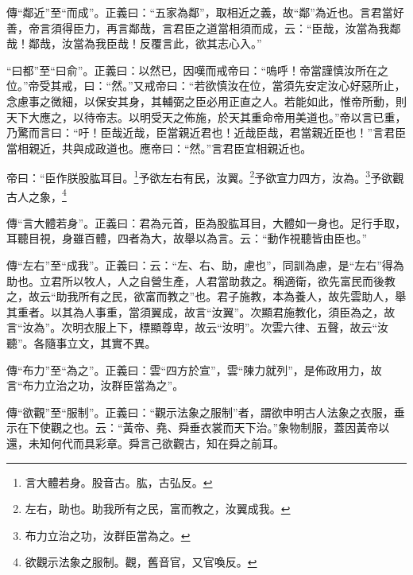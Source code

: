 {\noindent\zhuan{}\fzbyks 傳“鄰近”至“而成”。正義曰：“五家為鄰”，取相近之義，故“鄰”為近也。言君當好善，帝言須得臣力，再言鄰哉，言君臣之道當相須而成，云：“臣哉，汝當為我鄰哉！鄰哉，汝當為我臣哉！反覆言此，欲其志心入。” \par}

{\noindent\shu{}\fzkt “曰都”至“曰俞”。正義曰：以然已，因嘆而戒帝曰：“嗚呼！帝當謹慎汝所在之位。”帝受其戒，曰：“然。”又戒帝曰：“若欲慎汝在位，當須先安定汝心好惡所止，念慮事之微細，以保安其身，其輔弼之臣必用正直之人。若能如此，惟帝所動，則天下大應之，以待帝志。以明受天之佈施，於天其重命帝用美道也。”帝以言已重，乃驚而言曰：“吁！臣哉近哉，臣當親近君也！近哉臣哉，君當親近臣也！”言君臣當相親近，共與成政道也。應帝曰：“然。”言君臣宜相親近也。 \par}

帝曰：“臣作朕股肱耳目。\footnote{言大體若身。股音古。肱，古弘反。}予欲左右有民，汝翼。\footnote{左右，助也。助我所有之民，富而教之，汝翼成我。}予欲宣力四方，汝為。\footnote{布力立治之功，汝群臣當為之。}予欲觀古人之象，\footnote{欲觀示法象之服制。觀，舊音官，又官喚反。}


{\noindent\zhuan{}\fzbyks 傳“言大體若身”。正義曰：君為元首，臣為股肱耳目，大體如一身也。足行手取，耳聽目視，身雖百體，四者為大，故舉以為言。云：“動作視聽皆由臣也。” \par}

{\noindent\zhuan{}\fzbyks 傳“左右”至“成我”。正義曰：云：“左、右、助，慮也”，同訓為慮，是“左右”得為助也。立君所以牧人，人之自營生產，人君當助救之。稱適衛，欲先富民而後教之，故云“助我所有之民，欲富而教之”也。君子施教，本為養人，故先雲助人，舉其重者。以其為人事重，當須翼成，故言“汝翼”。次顯君施教化，須臣為之，故言“汝為”。次明衣服上下，標顯尊卑，故云“汝明”。次雲六律、五聲，故云“汝聽”。各隨事立文，其實不異。 \par}

{\noindent\zhuan{}\fzbyks 傳“布力”至“為之”。正義曰：雲“四方於宣”，雲“陳力就列”，是佈政用力，故言“布力立治之功，汝群臣當為之”。 \par}

{\noindent\zhuan{}\fzbyks 傳“欲觀”至“服制”。正義曰：“觀示法象之服制”者，謂欲申明古人法象之衣服，垂示在下使觀之也。云：“黃帝、堯、舜垂衣裳而天下治。”象物制服，蓋因黃帝以還，未知何代而具彩章。舜言己欲觀古，知在舜之前耳。 \par}

